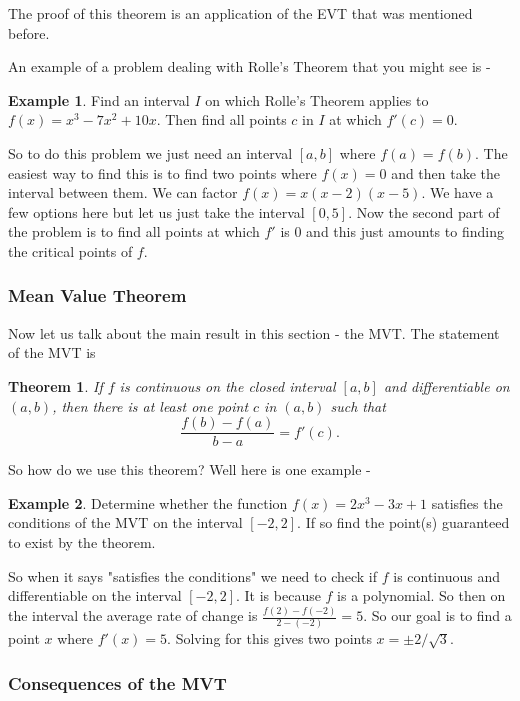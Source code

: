\documentclass[12pt,reqno]{article}
\newtheorem{Theorem}{Theorem}
\theoremstyle{definition}
\newtheorem*{Example}{Example}
\begin{document}
The proof of this theorem is an application of the EVT that was mentioned before. 

An example of a problem dealing with Rolle's Theorem that you might see is -
\begin{Example}
	Find an interval $I$ on which Rolle's Theorem applies to $f(x) = x^3 - 7x^2 + 10x$. Then find all points $c$ in $I$ at which $f'(c) = 0$. 
	
	So to do this problem we just need an interval $[a, b]$ where $f(a) = f(b)$. The easiest way to find this is to find two points where $f(x) = 0$ and then take the interval between them. We can factor $f(x) = x(x - 2)(x - 5)$. We have a few options here but let us just take the interval $[0, 5]$. Now the second part of the problem is to find all points at which $f'$ is 0 and this just amounts to finding the critical points of $f$. 
\end{Example}

\subsubsection{Mean Value Theorem}

Now let us talk about the main result in this section - the MVT. The statement of the MVT is 
\begin{Theorem}
	If $f$ is continuous on the closed interval $[a, b]$ and differentiable on $(a, b)$, then there is at least one point $c$ in $(a, b)$ such that $$\frac{f(b) - f(a)}{b - a} = f'(c).$$
\end{Theorem}

So how do we use this theorem? Well here is one example - 
\begin{Example}
	Determine whether the function $f(x) = 2x^3 - 3x + 1$ satisfies the conditions of the MVT on the interval $[-2, 2]$. If so find the point(s) guaranteed to exist by the theorem. 
	
	So when it says "satisfies the conditions" we need to check if $f$ is continuous and differentiable on the interval $[-2, 2]$. It is because $f$ is a polynomial. So then on the interval the average rate of change is $\frac{f(2) - f(-2)}{2 - (-2)}  = 5$. So our goal is to find a point $x$ where $f'(x) = 5$. Solving for this gives two points $x = \pm 2/\sqrt{3}$. 
\end{Example}

\subsubsection{Consequences of the MVT} 
\end{document}
